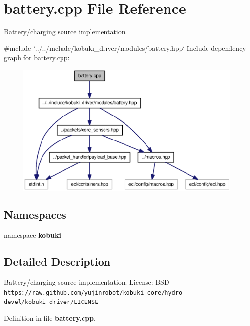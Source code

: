 \section{battery.\-cpp \-File \-Reference}
\label{battery_8cpp}


\-Battery/charging source implementation.  


{\ttfamily \#include \char`\"{}../../include/kobuki\-\_\-driver/modules/battery.\-hpp\char`\"{}}\*
\-Include dependency graph for battery.\-cpp\-:
\nopagebreak
\begin{figure}[H]
\begin{center}
\leavevmode
\includegraphics[width=350pt]{battery_8cpp__incl}
\end{center}
\end{figure}
\subsection*{\-Namespaces}
\begin{DoxyCompactItemize}
\item 
namespace {\bf kobuki}
\end{DoxyCompactItemize}


\subsection{\-Detailed \-Description}
\-Battery/charging source implementation. \-License\-: \-B\-S\-D {\tt https\-://raw.\-github.\-com/yujinrobot/kobuki\-\_\-core/hydro-\/devel/kobuki\-\_\-driver/\-L\-I\-C\-E\-N\-S\-E} 

\-Definition in file {\bf battery.\-cpp}.

